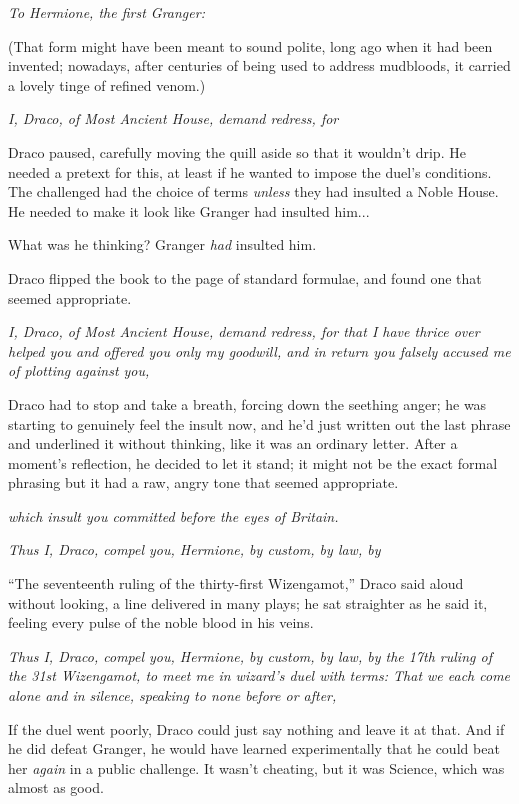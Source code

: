 \emph{To Hermione, the first Granger:}

(That form might have been meant to sound polite, long ago when it had been invented; nowadays, after centuries of being used to address mudbloods, it carried a lovely tinge of refined venom.)

\emph{I, Draco, of Most Ancient House, demand redress, for}

Draco paused, carefully moving the quill aside so that it wouldn't drip. He needed a pretext for this, at least if he wanted to impose the duel's conditions. The challenged had the choice of terms \emph{unless} they had insulted a Noble House. He needed to make it look like Granger had insulted him...

What was he thinking? Granger \emph{had} insulted him.

Draco flipped the book to the page of standard formulae, and found one that seemed appropriate.

\emph{I, Draco, of Most Ancient House, demand redress, for that I have thrice over helped you and offered you only my goodwill, and in return you falsely accused me of plotting against you,}

Draco had to stop and take a breath, forcing down the seething anger; he was starting to genuinely feel the insult now, and he'd just written out the last phrase and underlined it without thinking, like it was an ordinary letter. After a moment's reflection, he decided to let it stand; it might not be the exact formal phrasing but it had a raw, angry tone that seemed appropriate.

\emph{which insult you committed before the eyes of Britain.}

\emph{Thus I, Draco, compel you, Hermione, by custom, by law, by}

``The seventeenth ruling of the thirty-first Wizengamot,'' Draco said aloud without looking, a line delivered in many plays; he sat straighter as he said it, feeling every pulse of the noble blood in his veins.

\emph{Thus I, Draco, compel you, Hermione, by custom, by law, by the 17th ruling of the 31st Wizengamot, to meet me in wizard's duel with terms: That we each come alone and in silence, speaking to none before or after,}

If the duel went poorly, Draco could just say nothing and leave it at that. And if he did defeat Granger, he would have learned experimentally that he could beat her \emph{again} in a public challenge. It wasn't cheating, but it was Science, which was almost as good.

